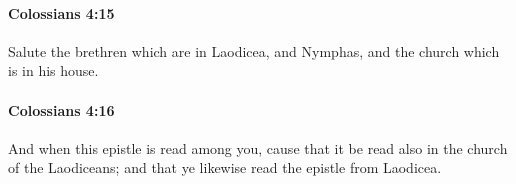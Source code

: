 		\paragraph{Colossians 4:15} %
			\label{COLOSSIANS-4-15}

			Salute the brethren which are in Laodicea, and Nymphas, and the church which is in his house.

			\begin{framed}
			\scriptsize
				\begin{compactdesc}
					\item[SBLG] 
				\end{compactdesc}
			\end{framed}

		\paragraph{Colossians 4:16} %
			\label{COLOSSIANS-4-16}

			And when this epistle is read among you, cause that it be read also in the church of the Laodiceans; and that ye likewise read the epistle from Laodicea.

